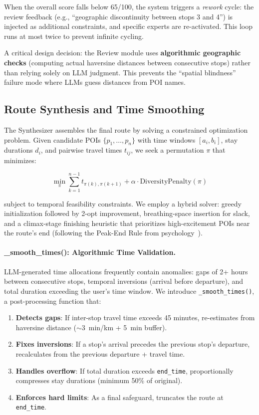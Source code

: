 \documentclass[11pt]{article}
\begin{document}
When the overall score falls below 65/100, the system triggers a \textit{rework} cycle: the review feedback (e.g., ``geographic discontinuity between stops 3 and 4'') is injected as additional constraints, and specific experts are re-activated. This loop runs at most twice to prevent infinite cycling.

A critical design decision: the Review module uses \textbf{algorithmic geographic checks} (computing actual haversine distances between consecutive stops) rather than relying solely on LLM judgment. This prevents the ``spatial blindness'' failure mode where LLMs guess distances from POI names.

\subsection{Route Synthesis and Time Smoothing}

The Synthesizer assembles the final route by solving a constrained optimization problem. Given candidate POIs $\{p_1, \ldots, p_n\}$ with time windows $[a_i, b_i]$, stay durations $d_i$, and pairwise travel times $t_{ij}$, we seek a permutation $\pi$ that minimizes:

\begin{equation}
\min_\pi \sum_{k=1}^{n-1} t_{\pi(k), \pi(k+1)} + \alpha \cdot \text{DiversityPenalty}(\pi)
\end{equation}

subject to temporal feasibility constraints. We employ a hybrid solver: greedy initialization followed by 2-opt improvement, breathing-space insertion for slack, and a climax-stage finishing heuristic that prioritizes high-excitement POIs near the route's end (following the Peak-End Rule from psychology~\cite{kahneman1999peak}).

\paragraph{\_smooth\_times(): Algorithmic Time Validation.}

LLM-generated time allocations frequently contain anomalies: gaps of 2+ hours between consecutive stops, temporal inversions (arrival before departure), and total duration exceeding the user's time window. We introduce \texttt{\_smooth\_times()}, a post-processing function that:

\begin{enumerate}[leftmargin=*]
    \item \textbf{Detects gaps}: If inter-stop travel time exceeds 45 minutes, re-estimates from haversine distance ($\sim$3~min/km + 5~min buffer).
    \item \textbf{Fixes inversions}: If a stop's arrival precedes the previous stop's departure, recalculates from the previous departure + travel time.
    \item \textbf{Handles overflow}: If total duration exceeds \texttt{end\_time}, proportionally compresses stay durations (minimum 50\% of original).
    \item \textbf{Enforces hard limits}: As a final safeguard, truncates the route at \texttt{end\_time}.
\end{enumerate}
\end{document}
